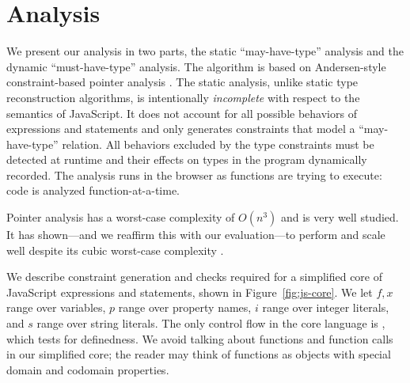 \section{Analysis}
\label{sec:analysis}

We present our analysis in two parts, the static ``may-have-type'' analysis
and the dynamic ``must-have-type'' analysis. The algorithm is based on
Andersen-style constraint-based pointer analysis \cite{AndersenPhD}. The
static analysis, unlike static type reconstruction algorithms, is
intentionally \textit{incomplete} with respect to the semantics of
JavaScript. It does not account for all possible behaviors of expressions and
statements and only generates constraints that model a ``may-have-type''
relation. All behaviors excluded by the type constraints must be detected at
runtime and their effects on types in the program dynamically recorded. The
analysis runs in the browser as functions are trying to execute: code is
analyzed function-at-a-time.

Pointer analysis has a worst-case complexity of $O(n^3)$ and is very
well studied. It has shown---and we reaffirm this with our evaluation---to
perform and scale well despite its cubic worst-case complexity
\cite{Sridharan09}.

%
%
%
%
%
%

We describe constraint generation and checks required for a simplified core of
JavaScript expressions and statements, shown in Figure~\ref{fig:js-core}. We
let $f,x$ range over variables, $p$ range over property names, $i$ range over
integer literals, and $s$ range over string literals. The only control flow in
the core language is , which tests for definedness. We avoid talking
about functions and function calls in our simplified core; the reader may
think of functions as objects with special domain and codomain properties.

